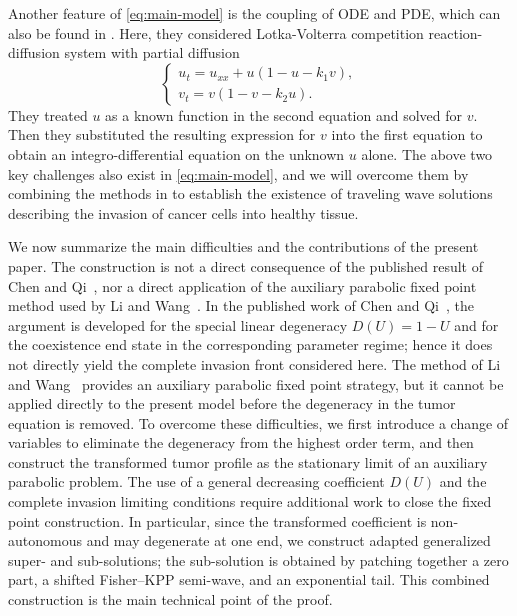 \documentclass[preprint,sort&compress,final,12pt]{elsarticle}
\numberwithin{equation}{section}
\begin{document}
Another feature of \eqref{eq:main-model} is the coupling of ODE and PDE, which can also be found in \cite{OuChunhua}. Here, they considered Lotka-Volterra competition reaction-diffusion system with partial diffusion
\begin{equation*}
\left\{\begin{array}{ll}
u_t=u_{xx}+u(1-u-k_1v),\\[0.2cm]
v_t=v(1-v-k_2u).
\end{array}\right.
\end{equation*}
They treated $u$ as a known function in the second equation and solved for $v$. Then they substituted the resulting expression for $v$ into the first equation to obtain an integro-differential equation on the unknown $u$ alone. The above two key challenges also exist in \eqref{eq:main-model}, and we will overcome them by combining the methods in \cite{OuChunhua,2021 Lijing wangzhian,Salako Shen 2017 DCDSB,ChenQi2025} to establish the existence of traveling wave solutions describing the invasion of cancer cells into healthy tissue.

We now summarize the main difficulties and the contributions of the present paper. The construction is not a direct consequence of the published result of Chen and Qi~\cite{ChenQi2025}, nor a direct application of the auxiliary parabolic fixed point method used by Li and Wang~\cite{2021 Lijing wangzhian}. In the published work of Chen and Qi~\cite{ChenQi2025}, the argument is developed for the special linear degeneracy $D(U)=1-U$ and for the coexistence end state in the corresponding parameter regime; hence it does not directly yield the complete invasion front considered here. The method of Li and Wang~\cite{2021 Lijing wangzhian} provides an auxiliary parabolic fixed point strategy, but it cannot be applied directly to the present model before the degeneracy in the tumor equation is removed. To overcome these difficulties, we first introduce a change of variables to eliminate the degeneracy from the highest order term, and then construct the transformed tumor profile as the stationary limit of an auxiliary parabolic problem. The use of a general decreasing coefficient $D(U)$ and the complete invasion limiting conditions require additional work to close the fixed point construction. In particular, since the transformed coefficient is non-autonomous and may degenerate at one end, we construct adapted generalized super- and sub-solutions; the sub-solution is obtained by patching together a zero part, a shifted Fisher--KPP semi-wave, and an exponential tail. This combined construction is the main technical point of the proof.
\end{document}
